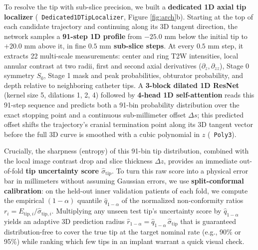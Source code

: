 \documentclass[
  11pt,
]{article}
\let\nforigtexttt\texttt
\renewcommand{\texttt}[1]{\nforigtexttt{\XeTeXinterchartokenstate=1 #1}}
\begin{document}
To resolve the tip with sub-slice precision, we built a
\textbf{dedicated 1D axial tip localizer}
(\texttt{Dedicated1DTipLocalizer}, Figure \ref{fig:arch}b). Starting at
the top of each candidate trajectory and continuing along its 3D tangent
direction, the network samples a \textbf{91-step 1D profile} from
\(-25.0\text{ mm}\) below the initial tip to \(+20.0\text{ mm}\) above
it, in fine \textbf{\(0.5\text{ mm}\) sub-slice steps}. At every
\(0.5\text{ mm}\) step, it extracts 22 multi-scale measurements: center
and ring T2W intensities, local annular contrast at two radii, first and
second axial derivatives (\(\partial_z, \partial_{zz}\)), Stage 0
symmetry \(S_0\), Stage 1 mask and peak probabilities, obturator
probability, and depth relative to neighboring catheter tips. A
\textbf{3-block dilated 1D ResNet} (kernel size 5, dilations 1, 2, 4)
followed by \textbf{4-head 1D self-attention} reads this 91-step
sequence and predicts both a 91-bin probability distribution over the
exact stopping point and a continuous sub-millimeter offset
\(\Delta s\); this predicted offset shifts the trajectory's cranial
termination point along its 3D tangent vector before the full 3D curve
is smoothed with a cubic polynomial in \(z\) (\texttt{Poly3}).

Crucially, the sharpness (entropy) of this 91-bin tip distribution,
combined with the local image contrast drop and slice thickness
\(\Delta z\), provides an immediate out-of-fold \textbf{tip uncertainty
score \(\hat{\sigma}_{\text{tip}}\)}. To turn this raw score into a
physical error bar in millimeters without assuming Gaussian errors, we
use \textbf{split-conformal calibration}: on the held-out inner
validation patients of each fold, we compute the empirical
\((1-\alpha)\) quantile \(\hat{q}_{1-\alpha}\) of the normalized
non-conformity ratios
\(r_i = E_{\text{tip}, i} / \hat{\sigma}_{\text{tip}, i}\). Multiplying
any unseen test tip's uncertainty score by \(\hat{q}_{1-\alpha}\) yields
an adaptive 3D prediction radius
\(\hat{r}_{1-\alpha} = \hat{q}_{1-\alpha}\,\hat{\sigma}_{\text{tip}}\)
that is guaranteed distribution-free to cover the true tip at the target
nominal rate (e.g., 90\% or 95\%) while ranking which few tips in an
implant warrant a quick visual check.
\end{document}
